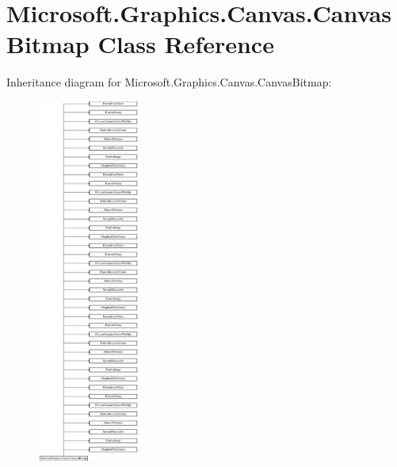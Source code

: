 \hypertarget{class_microsoft_1_1_graphics_1_1_canvas_1_1_canvas_bitmap}{}\section{Microsoft.\+Graphics.\+Canvas.\+Canvas\+Bitmap Class Reference}
\label{class_microsoft_1_1_graphics_1_1_canvas_1_1_canvas_bitmap}
Inheritance diagram for Microsoft.\+Graphics.\+Canvas.\+Canvas\+Bitmap\+:\begin{figure}[H]
\begin{center}
\leavevmode
\includegraphics[height=12.000000cm]{class_microsoft_1_1_graphics_1_1_canvas_1_1_canvas_bitmap}
\end{center}
\end{figure}
